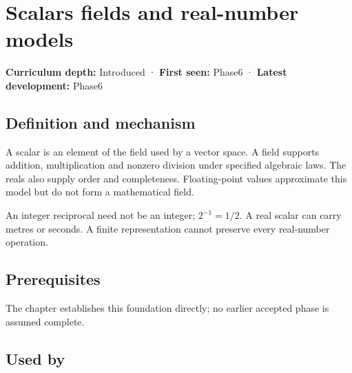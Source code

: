 \hypertarget{appendix-52051ad550fe}{}\label{referencestart:appendix-52051ad550fe}
\section{Scalars fields and real-number models}\label{appendix-52051ad550fe-scalars-fields-and-real-number-models}

\hypertarget{appendix-52051ad550fe-scalars-fields-and-real-number-models}{}

\textbf{Curriculum depth:} Introduced · \textbf{First seen:} Phase6 · \textbf{Latest development:} Phase6

\begin{allmightroledefinition}

\subsection{Definition and mechanism}\label{appendix-52051ad550fe-definition-and-mechanism}

\hypertarget{appendix-52051ad550fe-definition-and-mechanism}{}

A scalar is an element of the field used by a vector space. A field supports addition, multiplication and nonzero division under specified algebraic laws. The reals also supply order and completeness. Floating-point values approximate this model but do not form a mathematical field.

\end{allmightroledefinition}

An integer reciprocal need not be an integer; \(2^{-1}=1/2\). A real scalar can carry metres or seconds. A finite representation cannot preserve every real-number operation.

\subsection{Prerequisites}\label{appendix-52051ad550fe-prerequisites}

\hypertarget{appendix-52051ad550fe-prerequisites}{}

The chapter establishes this foundation directly; no earlier accepted phase is assumed complete.

\subsection{Used by}\label{appendix-52051ad550fe-used-by}

\hypertarget{appendix-52051ad550fe-used-by}{}

